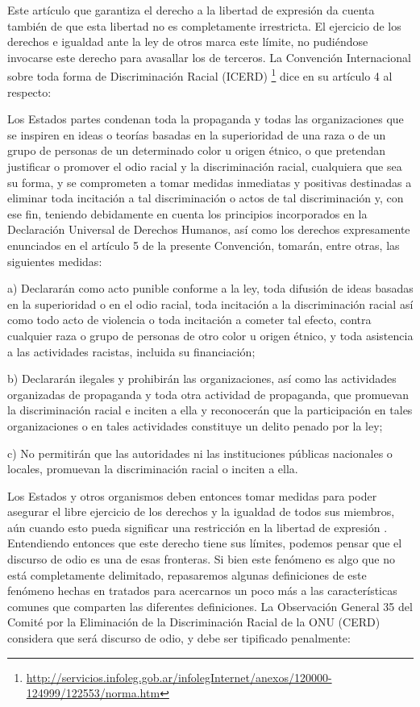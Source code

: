 Este artículo que garantiza el derecho a la libertad de expresión da cuenta también de que esta libertad no es completamente irrestricta. El ejercicio de los derechos e igualdad ante la ley de otros marca este límite, no pudiéndose invocarse este derecho para avasallar los de terceros. La Convención Internacional sobre toda forma de Discriminación Racial (ICERD) \footnote{\url{http://servicios.infoleg.gob.ar/infolegInternet/anexos/120000-124999/122553/norma.htm}} dice en su artículo 4 al respecto:

\begin{displayquote}

Los Estados partes condenan toda la propaganda y todas las organizaciones que se inspiren en ideas o teorías basadas en la superioridad de una raza o de un grupo de personas de un determinado color u origen étnico, o que pretendan justificar o promover el odio racial y la discriminación racial, cualquiera que sea su forma, y se comprometen a tomar medidas inmediatas y positivas destinadas a eliminar toda incitación a tal discriminación o actos de tal discriminación y, con ese fin, teniendo debidamente en cuenta los principios incorporados en la Declaración Universal de Derechos Humanos, así como los derechos expresamente enunciados en el artículo 5 de la presente Convención, tomarán, entre otras, las siguientes medidas:

a) Declararán como acto punible conforme a la ley, toda difusión de ideas basadas en la superioridad o en el odio racial, toda incitación a la discriminación racial así como todo acto de violencia o toda incitación a cometer tal efecto, contra cualquier raza o grupo de personas de otro color u origen étnico, y toda asistencia a las actividades racistas, incluida su financiación;

b) Declararán ilegales y prohibirán las organizaciones, así como las actividades organizadas de propaganda y toda otra actividad de propaganda, que promuevan la discriminación racial e inciten a ella y reconocerán que la participación en tales organizaciones o en tales actividades constituye un delito penado por la ley;

c) No permitirán que las autoridades ni las instituciones públicas nacionales o locales, promuevan la discriminación racial o inciten a ella.
\end{displayquote}


Los Estados y otros organismos deben entonces tomar medidas para poder asegurar el libre ejercicio de los derechos y la igualdad de todos sus miembros, aún cuando esto pueda significar una restricción en la libertad de expresión \cite{article192015}. Entendiendo entonces que este derecho tiene sus límites, podemos pensar que el discurso de odio es una de esas fronteras. Si bien este fenómeno es algo que no está completamente delimitado, repasaremos algunas definiciones de este fenómeno hechas en tratados para acercarnos un poco más a las características comunes que comparten las diferentes definiciones. La Observación General 35 del Comité por la Eliminación de la Discriminación Racial de la ONU (CERD) considera que será discurso de odio, y debe ser tipificado penalmente:

